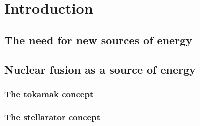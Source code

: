 \documentclass[my_thesis.tex]{subfiles}
\begin{document}
\cleardoublepage
\chapter*{Introduction}

\section{The need for new sources of energy}



\section{Nuclear fusion as a source of energy}

\subsection{The tokamak concept}

\subsection{The stellarator concept}
\end{document}
